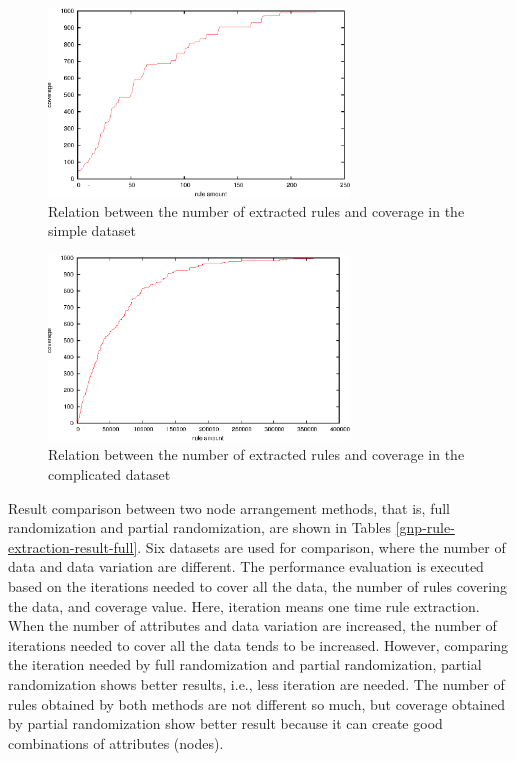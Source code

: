 \documentclass[fleqn,10pt,twocolumn]{SICE14}
\begin{document}
\begin{figure}[tb]
\includegraphics[width=8cm]{coveragerule-simple}
\caption{\label{coverage2014-02-13-11-53-24} Relation between the number of extracted rules and coverage in the simple dataset}
\end{figure}
\begin{figure}[tb]
\includegraphics[width=8cm]{coveragerule-complex}
\caption{\label{coverage2014-02-13-11-45-04} Relation between the number of extracted rules and coverage in the complicated dataset}
\end{figure}

Result comparison between two node arrangement methods, that is, full randomization and partial randomization, are shown in Tables \ref{gnp-rule-extraction-result-full}. Six datasets are used for comparison, where the number of data and data variation are different. The performance evaluation is executed based on the iterations needed to cover all the data, the number of rules covering the data, and coverage value. Here, iteration means one time rule extraction.
When the number of attributes and data variation are increased, the number of iterations needed to cover all the data tends to be increased. However, comparing the iteration needed by full randomization and partial randomization, partial randomization shows better results, i.e., less iteration are needed. The number of rules obtained by both methods are not different so much, but coverage obtained by partial randomization show better result because it can create good combinations of attributes (nodes).
\end{document}
